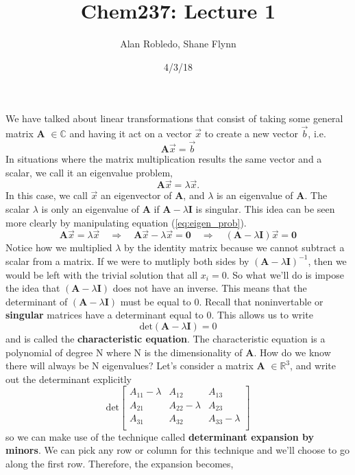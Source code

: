 \documentclass{article}
\title{Chem237: Lecture 1}
\date{4/3/18}
\author{Alan Robledo, Shane Flynn}
\newcommand{\be}{\begin{equation}}
\newcommand{\ee}{\end{equation}}
\begin{document}
\maketitle
We have talked about linear transformations that consist of taking some general matrix \textbf{A} $\in \mathbb{C}$ and having it act on a vector $\vec{x}$ to create a new vector $\vec{b}$, i.e.
\be
  \textbf{A} \vec{x} = \vec{b}
\ee
In situations where the matrix multiplication results the same vector and a scalar, we call it an eigenvalue problem,
\be \label{eq:eigen_prob}
  \textbf{A} \vec{x} = \lambda \vec{x} .
\ee
In this case, we call $\vec{x}$ an eigenvector of \textbf{A}, and $\lambda$ is an eigenvalue of \textbf{A}.
The scalar $\lambda$ is only an eigenvalue of \textbf{A} if $\textbf{A} - \lambda \textbf{I}$ is singular.
This idea can be seen more clearly by manipulating equation (\ref{eq:eigen_prob}).
\be
  \textbf{A} \vec{x} = \lambda \vec{x} \quad \Longrightarrow \quad \textbf{A} \vec{x} - \lambda \vec{x} = \textbf{0} \quad \Longrightarrow \quad (\textbf{A} - \lambda \textbf{I})\vec{x} = \textbf{0}
\ee
Notice how we multiplied $\lambda$ by the identity matrix because we cannot subtract a scalar from a matrix.
If we were to mutliply both sides by $(\textbf{A} - \lambda \textbf{I})^{-1}$, then we would be left with the trivial solution that all $x_i = 0$.
So what we'll do is impose the idea that $(\textbf{A} - \lambda \textbf{I})$ does not have an inverse.
This means that the determinant of $(\textbf{A} - \lambda \textbf{I})$ must be equal to 0.
Recall that noninvertable or \textbf{singular} matrices have a determinant equal to 0.
This allows us to write
\be
  \text{det}(\textbf{A} - \lambda \textbf{I}) = 0
\ee
and is called the \textbf{characteristic equation}.
The characteristic equation is a polynomial of degree N where N is the dimensionality of \textbf{A}.
How do we know there will always be N eigenvalues?
Let's consider a matrix \textbf{A} $\in \mathbb{R}^3$, and write out the determinant explicitly
\be
  \text{det}
  \begin{bmatrix}
    A_{11} - \lambda  & A_{12} & A_{13} \\
    A_{21} & A_{22} - \lambda & A_{23} \\
    A_{31} & A_{32} & A_{33} - \lambda \\
  \end{bmatrix}
\ee
so we can make use of the technique called \textbf{determinant expansion by minors}.
We can pick any row or column for this technique and we'll choose to go along the first row.
Therefore, the expansion becomes,
\end{document}
